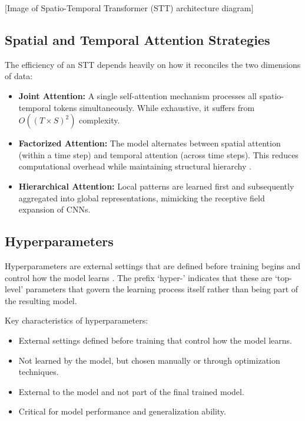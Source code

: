 \documentclass[12pt, a4paper]{report}
\begin{document}
[Image of Spatio-Temporal Transformer (STT) architecture diagram]

\subsection{Spatial and Temporal Attention Strategies}
The efficiency of an STT depends heavily on how it reconciles the two dimensions of data:
\begin{itemize}
    \item \textbf{Joint Attention:} A single self-attention mechanism processes all spatio-temporal tokens simultaneously. While exhaustive, it suffers from $O((T \times S)^2)$ complexity.
    \item \textbf{Factorized Attention:} The model alternates between spatial attention (within a time step) and temporal attention (across time steps). This reduces computational overhead while maintaining structural hierarchy \cite{bertasius2021space}.
    \item \textbf{Hierarchical Attention:} Local patterns are learned first and subsequently aggregated into global representations, mimicking the receptive field expansion of CNNs.
\end{itemize}















\subsection{Hyperparameters}
Hyperparameters are external settings that are defined before training begins and control how the model learns . The prefix `hyper-' indicates that these are `top-level' parameters that govern the learning process itself rather than being part of the resulting model.

Key characteristics of hyperparameters:
\begin{itemize}
    \item External settings defined before training that control how the model learns.
    \item Not learned by the model, but chosen manually or through optimization techniques.
    \item External to the model and not part of the final trained model.
    \item Critical for model performance and generalization ability.
\end{itemize}
\end{document}
